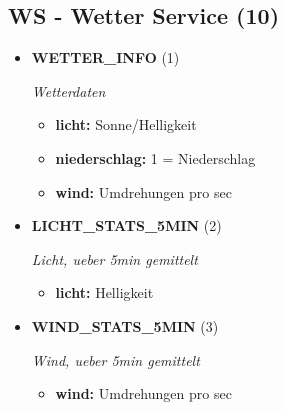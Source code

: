 \subsection{WS - Wetter Service (10)}
\begin{itemize}
		
\item \textbf{WETTER\_INFO} (1)

\textit{Wetterdaten}

\small
\begin{itemize}
		
\item \textbf{licht:} Sonne/Helligkeit
\item \textbf{niederschlag:} 1 = Niederschlag
\item \textbf{wind:} Umdrehungen pro sec
\end{itemize}
\normalsize
	
\item \textbf{LICHT\_STATS\_5MIN} (2)

\textit{Licht, ueber 5min gemittelt}

\small
\begin{itemize}
		
\item \textbf{licht:} Helligkeit
\end{itemize}
\normalsize
	
\item \textbf{WIND\_STATS\_5MIN} (3)

\textit{Wind, ueber 5min gemittelt}

\small
\begin{itemize}
		
\item \textbf{wind:} Umdrehungen pro sec
\end{itemize}
\normalsize
	
\end{itemize}
	